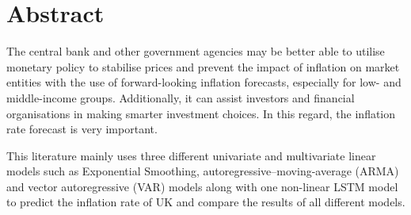 \chapter*{Abstract}

The central bank and other government agencies may be better able to utilise monetary policy to stabilise prices and prevent the impact of inflation on market entities with the use of forward-looking inflation forecasts, especially for low- and middle-income groups. Additionally, it can assist investors and financial organisations in making smarter investment choices. In this regard, the inflation rate forecast is very important.

This literature mainly uses three different univariate  and multivariate linear models such as Exponential Smoothing, autoregressive–moving-average (ARMA)  and vector autoregressive (VAR)  models along with one non-linear LSTM model to predict the inflation rate of UK and compare the results of all different models.